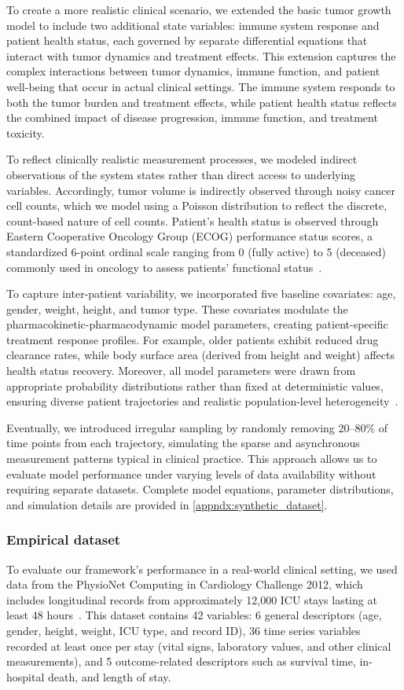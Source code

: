 \documentclass[preprint,12pt]{elsarticle}
\begin{document}
To create a more realistic clinical scenario, we extended the basic tumor growth model to include two additional state variables: immune system response and patient health status, each governed by separate differential equations that interact with tumor dynamics and treatment effects. This extension captures the complex interactions between tumor dynamics, immune function, and patient well-being that occur in actual clinical settings. The immune system responds to both the tumor burden and treatment effects, while patient health status reflects the combined impact of disease progression, immune function, and treatment toxicity.

To reflect clinically realistic measurement processes, we modeled indirect observations of the system states rather than direct access to underlying variables. Accordingly, tumor volume is indirectly observed through noisy cancer cell counts, which we model using a Poisson distribution to reflect the discrete, count-based nature of cell counts. Patient's health status is observed through Eastern Cooperative Oncology Group (ECOG) performance status scores, a standardized 6-point ordinal scale ranging from 0 (fully active) to 5 (deceased) commonly used in oncology to assess patients' functional status~\citep{oken1982ecog}.

To capture inter-patient variability, we incorporated five baseline covariates: age, gender, weight, height, and tumor type. These covariates modulate the pharmacokinetic-pharmacodynamic model parameters, creating patient-specific treatment response profiles. For example, older patients exhibit reduced drug clearance rates, while body surface area (derived from height and weight) affects health status recovery. Moreover, all model parameters were drawn from appropriate probability distributions rather than fixed at deterministic values, ensuring diverse patient trajectories and realistic population-level heterogeneity~\citep{kacprzyk2024ode}.

Eventually, we introduced irregular sampling by randomly removing 20--80\% of time points from each trajectory, simulating the sparse and asynchronous measurement patterns typical in clinical practice. This approach allows us to evaluate model performance under varying levels of data availability without requiring separate datasets.
Complete model equations, parameter distributions, and simulation details are provided in \ref{appndx:synthetic_dataset}.


\subsubsection{Empirical dataset}
To evaluate our framework's performance in a real-world clinical setting, we used data from the PhysioNet Computing in Cardiology Challenge 2012, which includes longitudinal records from approximately 12,000 ICU stays lasting at least 48 hours~\citep{churpek2016value}. This dataset contains 42 variables: 6 general descriptors (age, gender, height, weight, ICU type, and record ID), 36 time series variables recorded at least once per stay (vital signs, laboratory values, and other clinical measurements), and 5 outcome-related descriptors such as survival time, in-hospital death, and length of stay.
\end{document}
